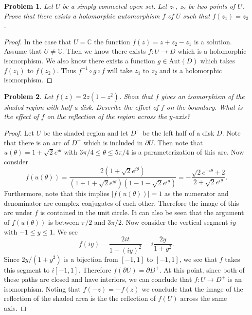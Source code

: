 \documentclass{article}
\newtheorem{problem}{Problem}
\begin{document}
\begin{problem}
Let $U$ be a simply connected open set. Let $z_1$, $z_2$ be two points of $U$. Prove that there exists a holomorphic automorphism $f$ of $U$ such that $f(z_1) = z_2$.
\end{problem}
\begin{proof}
In the case that $U = \mathbb{C}$ the function $f(z) = z + z_2 - z_1$ is a solution. Assume that $U \neq \mathbb{C}$. Then we know there exists $f : U \to D$ which is a holomorphic isomorphism. We also know there exists a function $g \in \text{Aut}(D)$ which takes $f(z_1)$ to $f(z_2)$. Thus $f^{-1} \circ g \circ f$ will take $z_1$ to $z_2$ and is a holomorphic isomorphism.
\end{proof}

\begin{problem}
Let $f(z) = 2z(1-z^2)$. Show that $f$ gives an isomorphism of the shaded region with half a disk. Describe the effect of $f$ on the boundary. What is the effect of $f$ on the reflection of the region across the $y$-axis?
\end{problem}
\begin{proof}
Let $U$ be the shaded region and let $D^+$ be the left half of a disk $D$. Note that there is an arc of $D^+$ which is included in $\partial U$. Then note that $u(\theta) = 1 + \sqrt{2} e^{i \theta}$ with $3 \pi/4 \leq \theta \leq 5 \pi/4$ is a parameterization of this arc. Now consider
\[
f(u(\theta)) = \frac{2(1 + \sqrt{2}e^{i \theta})}{(1 + 1 + \sqrt{2}e^{i \theta})(1 - 1 - \sqrt{2}e^{i \theta})} = -\frac{\sqrt{2}e^{-i \theta} + 2}{2 + \sqrt{2}e^{i \theta}}.
\]
Furthermore, note that this implies $|f(u(\theta))| = 1$ as the numerator and denominator are complex conjugates of each other. Therefore the image of this arc under $f$ is contained in the unit circle. It can also be seen that the argument of $f(u(\theta))$ is between $\pi/2$ and $3\pi /2$. Now consider the vertical segment $iy$ with $-1 \leq y \leq 1$. We see
\[
f(iy) = \frac{2it}{1 - (iy)^2} = i \frac{2y}{1+y^2}.
\]
Since $2y/(1+y^2)$ is a bijection from $[-1,1]$ to $[-1,1]$, we see that $f$ takes this segment to $i[-1,1]$. Therefore $f(\partial U) = \partial D^+$. At this point, since both of these paths are closed and have interiors, we can conclude that $f : U \to D^+$ is an isomorphism. Noting that $f(-z) = -f(z)$ we conclude that the image of the reflection of the shaded area is the the reflection of $f(U)$ across the same axis.
\end{proof}
\end{document}
